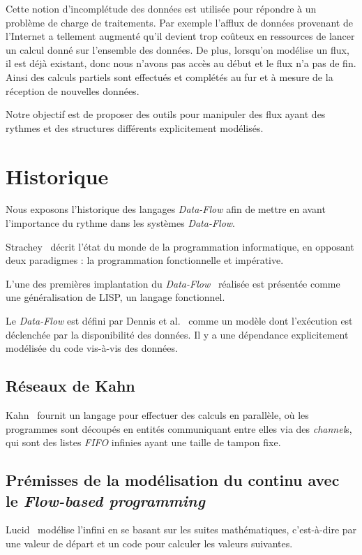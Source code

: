 \documentclass{llncs}
\newcommand{\DF}{\emph{Data-Flow} }
\newcommand{\DFc}{\emph{Data-Flow}}
\newcommand{\DFp}{\emph{Data-Flow}. }
\newcommand{\FB}{\emph{Flow-based programming} }
\begin{document}
Cette notion d'incomplétude des données est utilisée pour répondre à un problème
de charge de traitements.
Par exemple l'afflux de données provenant de l'Internet a tellement augmenté qu'il
devient trop coûteux en ressources de lancer un calcul donné sur l'ensemble des
données.
De plus, lorsqu'on modélise un flux, il est déjà existant, donc nous n'avons pas
accès au début et le flux n'a pas de fin.
Ainsi des calculs partiels sont effectués et complétés au fur et à mesure de la
réception de nouvelles données.

Notre objectif est de proposer des outils pour manipuler des flux ayant des
rythmes et des structures différents explicitement modélisés.

\section{Historique}
Nous exposons l'historique des langages \DF afin
de mettre en avant l'importance du rythme dans les systèmes \DFp

Strachey~\cite{Strachey73} décrit l'état du monde de la programmation
informatique, en opposant deux paradigmes : la programmation fonctionnelle et impérative.

L'une des premières implantation du \DFc~\cite{Dennis72} réalisée
est présentée comme une généralisation de LISP, un langage fonctionnel.

Le \DF est défini par Dennis et al.~\cite{Dennis72} comme un modèle dont l'exécution
est déclenchée par la disponibilité des données.
Il y a une dépendance explicitement modélisée du code vis-à-vis des données.

\subsection{Réseaux de Kahn}
Kahn~\cite{Kahn74} fournit un langage pour effectuer des calculs en parallèle,
où les programmes sont découpés en entités communiquant entre elles via des
\emph{channel}s, qui sont des listes \emph{FIFO} infinies ayant une taille de
tampon fixe.

\subsection{Prémisses de la modélisation du continu avec le \FB}
Lucid~\cite{AshcroftW76} modélise l'infini en se basant sur les suites mathématiques,
c'est-à-dire par une valeur de départ et un code pour calculer les valeurs suivantes.
\end{document}
